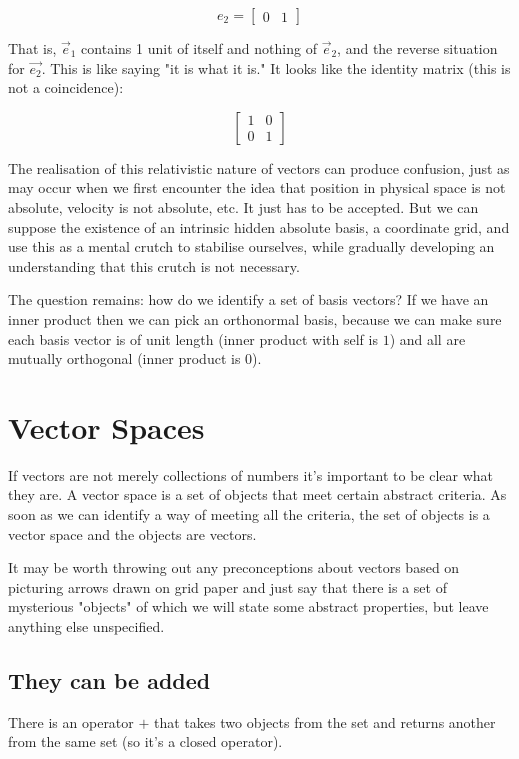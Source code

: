 $$e_2 = \begin{bmatrix}0 & 1\end{bmatrix}$$

That is, $\vec{e}_1$ contains 1 unit of itself and nothing of $\vec{e}_2$, and the reverse situation for $\vec{e_2}$. This is like saying "it is what it is." It looks like the identity matrix (this is not a coincidence):

$$
\begin{bmatrix}1 & 0 \\ 0 & 1\end{bmatrix}
$$

The realisation of this relativistic nature of vectors can produce confusion, just as may occur when we first encounter the idea that position in physical space is not absolute, velocity is not absolute, etc. It just has to be accepted. But we can suppose the existence of an intrinsic hidden absolute basis, a coordinate grid, and use this as a mental crutch to stabilise ourselves, while gradually developing an understanding that this crutch is not necessary.

The question remains: how do we identify a set of basis vectors? If we have an inner product then we can pick an orthonormal basis, because we can make sure each basis vector is of unit length (inner product with self is $1$) and all are mutually orthogonal (inner product is $0$).

\section{Vector Spaces}\label{sec:vectors-space}

If vectors are not merely collections of numbers it's important to be clear what they are. A vector space is a set of objects that meet certain abstract criteria. As soon as we can identify a way of meeting all the criteria, the set of objects is a vector space and the objects are vectors.

It may be worth throwing out any preconceptions about vectors based on picturing arrows drawn on grid paper and just say that there is a set of mysterious "objects" of which we will state some abstract properties, but leave anything else unspecified.

\subsection{They can be added}

There is an operator $+$ that takes two objects from the set and returns another from the same set (so it's a closed operator).

